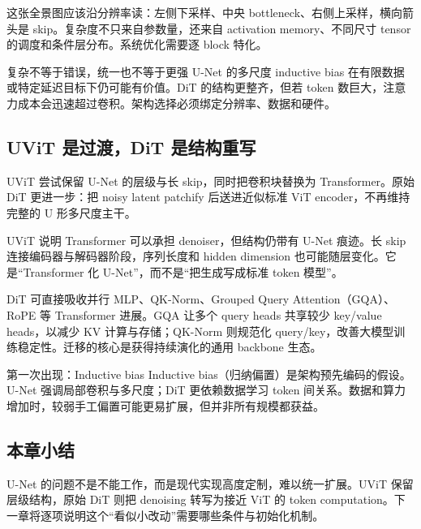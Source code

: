 
这张全景图应该沿分辨率读：左侧下采样、中央 bottleneck、右侧上采样，横向箭头是 skip。复杂度不只来自参数量，还来自 activation memory、不同尺寸 tensor 的调度和条件层分布。系统优化需要逐 block 特化。

\begin{warningbox}{复杂不等于错误，统一也不等于更强}
U-Net 的多尺度 inductive bias 在有限数据或特定延迟目标下仍可能有价值。DiT 的结构更整齐，但若 token 数巨大，注意力成本会迅速超过卷积。架构选择必须绑定分辨率、数据和硬件。
\end{warningbox}

\subsection{UViT 是过渡，DiT 是结构重写}

UViT 尝试保留 U-Net 的层级与长 skip，同时把卷积块替换为 Transformer。原始 DiT 更进一步：把 noisy latent patchify 后送进近似标准 ViT encoder，不再维持完整的 U 形多尺度主干。


UViT 说明 Transformer 可以承担 denoiser，但结构仍带有 U-Net 痕迹。长 skip 连接编码器与解码器阶段，序列长度和 hidden dimension 也可能随层变化。它是“Transformer 化 U-Net”，而不是“把生成写成标准 token 模型”。


DiT 可直接吸收并行 MLP、QK-Norm、Grouped Query Attention（GQA）、RoPE 等 Transformer 进展。GQA 让多个 query heads 共享较少 key/value heads，以减少 KV 计算与存储；QK-Norm 则规范化 query/key，改善大模型训练稳定性。迁移的核心是获得持续演化的通用 backbone 生态。


\begin{knowledgebox}{第一次出现：Inductive bias}
Inductive bias（归纳偏置）是架构预先编码的假设。U-Net 强调局部卷积与多尺度；DiT 更依赖数据学习 token 间关系。数据和算力增加时，较弱手工偏置可能更易扩展，但并非所有规模都获益。
\end{knowledgebox}

\subsection{本章小结}

U-Net 的问题不是不能工作，而是现代实现高度定制，难以统一扩展。UViT 保留层级结构，原始 DiT 则把 denoising 转写为接近 ViT 的 token computation。下一章将逐项说明这个“看似小改动”需要哪些条件与初始化机制。

